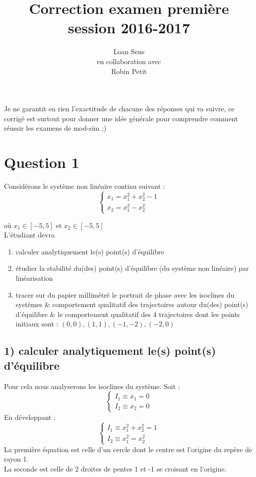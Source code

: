 \documentclass[11pt,a4paper]{report}
\title{Correction examen première session 2016-2017}
\author{Loan Sens\\ en collaboration avec\\Robin Petit}
\begin{document}
	\maketitle
		
	Je ne garantit en rien l'exactitude de chacune des réponses qui va suivre, ce corrigé est surtout pour donner une idée générale pour comprendre comment réussir les examens de mod-sim ;)
	
	\section*{Question 1}
		Considérons le système non linéaire continu suivant :
		\[
		\begin{cases} 
			\dot{x_1} = x_1^2 + x_2^2 -1 \\ 
			\dot{x_2} = x_1^2 - x_2^2
		\end{cases}
		\]
		
		où $x_1 \in [-5, 5]$ et $x_2 \in [-5, 5]$\\
		
		L'étudiant devra 
		\begin{enumerate}
			\item calculer analytiquement le(s) point(s) d'équilibre
			\item étudier la stabilité du(des) point(s) d'équilibre (du système non linéaire) par linéarisation
			\item tracer sur du papier millimétré le portrait de phase avec les isoclines du systèmes \& comportement qualitatif des trajectoires autour du(des) point(s) d'équilibre \& le comportement qualitatif des 4 trajectoires dont les points initiaux sont : $(0,0) , (1,1), (-1, -2), (-2,0)$
		\end{enumerate}
		\pagebreak
		
		\subsection*{1) calculer analytiquement le(s) point(s) d'équilibre}
			
			Pour cela nous analyserons les isoclines du système.
			Soit : 
			\[
			\begin{cases} 
				I_1 \equiv \dot{x_1} = 0 \\ 
				I_2 \equiv \dot{x_2} = 0
			\end{cases}
			\]
			En développant : 
			\[
			\begin{cases} 
				I_1 \equiv x_1^2 + x_2^2 = 1 \\ 
				I_2 \equiv x_1^2 = x_2^2
			\end{cases}
			\]
			La première équation est celle d'un cercle dont le centre est l'origine du repère de rayon 1.\\
			La seconde est celle de 2 droites de pentes 1 et -1 se croisant en l'origine.\\
			
\end{document}
